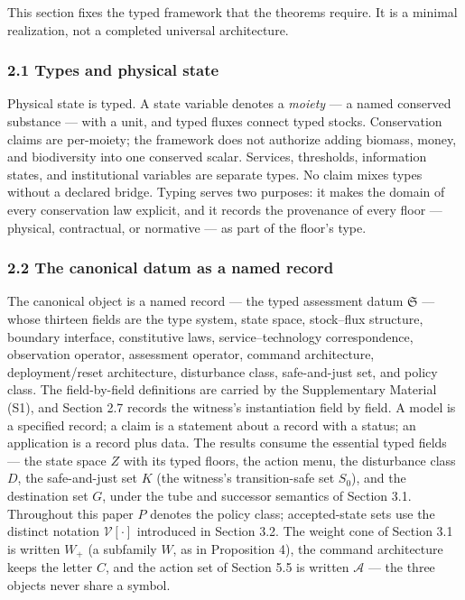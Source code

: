 \documentclass[11pt]{article}
\begin{document}
This section fixes the typed framework that the theorems require. It is
a minimal realization, not a completed universal architecture.

\subsubsection{2.1 Types and physical
state}\label{types-and-physical-state}

Physical state is typed. A state variable denotes a \emph{moiety} --- a
named conserved substance --- with a unit, and typed fluxes connect
typed stocks. Conservation claims are per-moiety; the framework does not
authorize adding biomass, money, and biodiversity into one conserved
scalar. Services, thresholds, information states, and institutional
variables are separate types. No claim mixes types without a declared
bridge. Typing serves two purposes: it makes the domain of every
conservation law explicit, and it records the provenance of every floor
--- physical, contractual, or normative --- as part of the floor's type.

\subsubsection{2.2 The canonical datum as a named
record}\label{the-canonical-datum-as-a-named-record}

The canonical object is a named record --- the typed assessment datum
\(\mathfrak{S}\) --- whose thirteen fields are the type system, state
space, stock--flux structure, boundary interface, constitutive laws,
service--technology correspondence, observation operator, assessment
operator, command architecture, deployment/reset architecture,
disturbance class, safe-and-just set, and policy class. The
field-by-field definitions are carried by the Supplementary Material
(S1), and Section 2.7 records the witness's instantiation field by
field. A model is a specified record; a claim is a statement about a
record with a status; an application is a record plus data. The results
consume the essential typed fields --- the state space \(Z\) with its
typed floors, the action menu, the disturbance class \(D\), the
safe-and-just set \(K\) (the witness's transition-safe set \(S_0\)), and
the destination set \(G\), under the tube and successor semantics of
Section 3.1. Throughout this paper \(P\) denotes the policy class;
accepted-state sets use the distinct notation \(\mathcal{V}[\cdot]\)
introduced in Section 3.2. The weight cone of Section 3.1 is written
\(W_+\) (a subfamily \(W\), as in Proposition 4), the command
architecture keeps the letter \(C\), and the action set of Section 5.5
is written \(\mathcal{A}\) --- the three objects never share a symbol.
\end{document}
